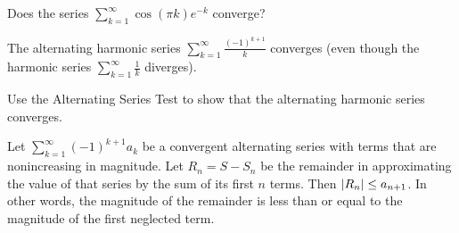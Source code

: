 \documentclass[../mathNotesPreamble]{subfiles}
\begin{document}
  \begin{ex*}
    Does the series $\displaystyle\sum_{k=1}^\infty \cos(\pi k)e^{-k}$ converge? 
  \end{ex*}
  \pagebreak

  \begin{thmBox*}
    The alternating harmonic series $\displaystyle\sum_{k=1}^\infty \frac{(-1)^{k+1}}{k}$ converges (even though the harmonic series $\displaystyle\sum_{k=1}^\infty \frac{1}{k}$ diverges).
  \end{thmBox*}
  \begin{ex*}
    Use the Alternating Series Test to show that the alternating harmonic series converges.
  \end{ex*}
  \pagebreak

  \begin{thmBox*}
    Let $\displaystyle\sum_{k=1}^\infty (-1)^{k+1} a_k$ be a convergent alternating series with terms that are nonincreasing in magnitude. Let $R_n=S-S_n$ be the remainder in approximating the value of that series  by the sum of its first $n$ terms. Then ${\left\vert R_n\right\vert}\leq a_{n+1}$. In other words, the magnitude of the remainder is less than or equal to the magnitude of the first neglected term.
  \end{thmBox*}
\end{document}
